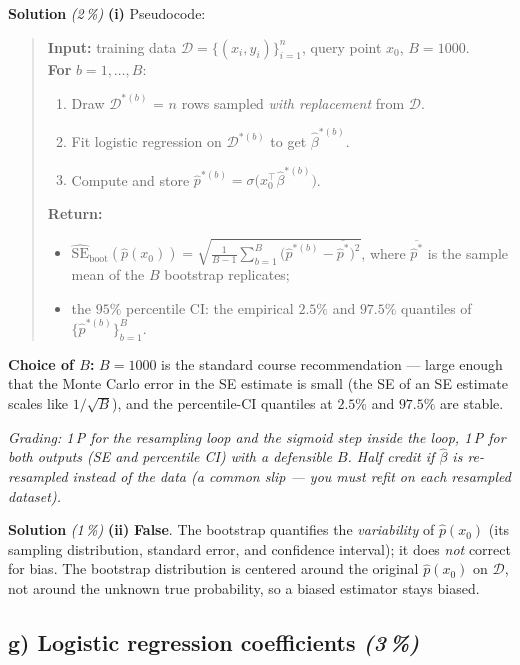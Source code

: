\documentclass[11pt,a4paper]{article}
\newcommand{\subpoints}[1]{\textit{(#1\,\%)}}
\newcommand{\sol}{\noindent\textbf{Solution}}
\begin{document}
\sol{} \subpoints{2} \textbf{(i)} Pseudocode:
\begin{quote}\small
\textbf{Input:} training data $\mathcal{D}=\{(x_i,y_i)\}_{i=1}^n$, query point $x_0$, $B = 1000$. \\
\textbf{For} $b = 1, \dots, B$:
\begin{enumerate}
  \item Draw $\mathcal{D}^{*(b)}$ = $n$ rows sampled \emph{with replacement} from $\mathcal{D}$.
  \item Fit logistic regression on $\mathcal{D}^{*(b)}$ to get $\hat\beta^{*(b)}$.
  \item Compute and store $\hat p^{*(b)} = \sigma\bigl(x_0^\top \hat\beta^{*(b)}\bigr)$.
\end{enumerate}
\textbf{Return:}
\begin{itemize}
  \item $\widehat{\mathrm{SE}}_{\text{boot}}(\hat p(x_0))
            = \sqrt{\tfrac{1}{B-1}\sum_{b=1}^B \bigl(\hat p^{*(b)} - \overline{\hat p^*}\bigr)^2}$,
        where $\overline{\hat p^*}$ is the sample mean of the $B$ bootstrap replicates;
  \item the $95\%$ percentile CI: the empirical $2.5\%$ and $97.5\%$ quantiles of
        $\{\hat p^{*(b)}\}_{b=1}^B$.
\end{itemize}
\end{quote}
\textbf{Choice of $B$:} $B = 1000$ is the standard course recommendation --- large enough that the
Monte Carlo error in the SE estimate is small (the SE of an SE estimate scales like $1/\sqrt B$),
and the percentile-CI quantiles at $2.5\%$ and $97.5\%$ are stable.

\noindent\emph{Grading: 1\,P for the resampling loop and the sigmoid step inside the loop, 1\,P for
both outputs (SE \emph{and} percentile CI) with a defensible $B$. Half credit if $\hat\beta$ is
re-resampled instead of the data (a common slip --- you must refit on each resampled dataset).}

\medskip
\sol{} \subpoints{1} \textbf{(ii)} \textbf{False}. The bootstrap quantifies the \emph{variability}
of $\hat p(x_0)$ (its sampling distribution, standard error, and confidence interval); it does
\emph{not} correct for bias. The bootstrap distribution is centered around the original
$\hat p(x_0)$ on $\mathcal D$, not around the unknown true probability, so a biased estimator
stays biased.

\subsection*{g) Logistic regression coefficients \subpoints{3}}
\end{document}
